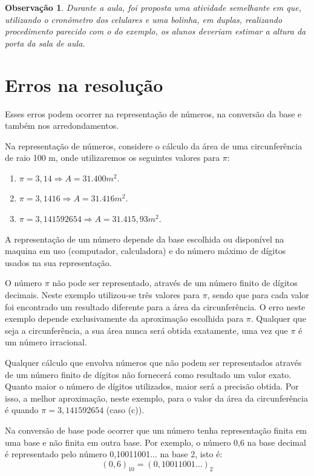 \documentclass[12pt,a4paper]{book}
\newtheorem{remark}{Observação}
\begin{document}
\begin{remark}
	Durante a aula, foi proposta uma atividade semelhante em que, utilizando o cronômetro dos celulares e uma bolinha, em duplas, realizando procedimento parecido com o do exemplo, os alunos deveriam estimar a altura da porta da sala de aula.
\end{remark}

\section{Erros na resolução}

Esses erros podem ocorrer na representação de números, na conversão da base e também nos arredondamentos.

Na representação de números, considere o cálculo da área de uma circunferência de raio 100 m, onde utilizaremos os seguintes valores para $\pi$:
\begin{enumerate}[label=\Alph*]
	\item $\pi=3,14\Longrightarrow A=31.400 m^2$.
	\item $\pi=3,1416\Longrightarrow A=31.416 m^2$.
	\item $\pi=3,141592654\Longrightarrow A=31.415,93 m^2$.
\end{enumerate}

A representação de um número depende da base escolhida ou disponível na maquina em uso (computador, calculadora) e do número máximo de dígitos usados na sua representação.

O número $\pi$ não pode ser representado, através de um número finito de dígitos decimais. Neste exemplo utilizou-se três valores para $\pi$, sendo que para cada valor foi encontrado um resultado diferente para a área da circunferência. O erro neste exemplo depende exclusivamente da aproximação escolhida para $\pi$. Qualquer que seja a circunferência, a sua área nunca será obtida exatamente, uma vez que $\pi$ é um número irracional.

Qualquer cálculo que envolva números que não podem ser representados através de um número finito de dígitos não fornecerá como resultado um valor exato. Quanto maior o número de dígitos utilizados, maior será a precisão obtida. Por isso, a melhor aproximação, neste exemplo, para o valor da área da circunferência é quando $\pi=3,141592654$ (caso (c)).

Na conversão de base pode ocorrer que um número tenha representação finita em uma base e não finita em outra base. Por exemplo, o número 0,6 na base decimal é representado pelo número 0,10011001$\dots$ na base 2, isto é:
$$
	(0,6)_{10}=(0,10011001\dots)_{2}
$$
\end{document}
